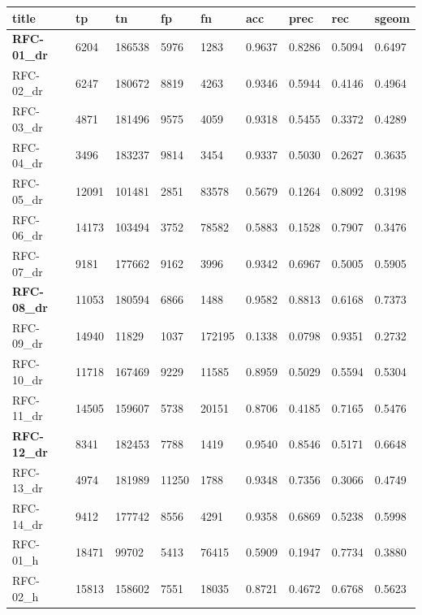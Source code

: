 \documentclass[12pt]{article}
\begin{document}
\begin{flushleft}
\begin{landscape}
		\begin{tabular}{| l | l | l | l | l | l | l | l | l |}
			\rowcolor{gray!50}
			\hline
			title & tp & tn & fp & fn & acc & prec & rec & sgeom \\ \hline
			\textbf{RFC-01\_dr} & 6204 & 186538 & 5976 & 1283 & 0.9637 & 0.8286 & 0.5094 & 0.6497 \\ \hline
			RFC-02\_dr & 6247 & 180672 & 8819 & 4263 & 0.9346 & 0.5944 & 0.4146 & 0.4964 \\ \hline
			RFC-03\_dr & 4871 & 181496 & 9575 & 4059 & 0.9318 & 0.5455 & 0.3372 & 0.4289 \\ \hline
			RFC-04\_dr & 3496 & 183237 & 9814 & 3454 & 0.9337 & 0.5030 & 0.2627 & 0.3635 \\ \hline
			RFC-05\_dr & 12091 & 101481 & 2851 & 83578 & 0.5679 & 0.1264 & 0.8092 & 0.3198 \\ \hline
			RFC-06\_dr & 14173 & 103494 & 3752 & 78582 & 0.5883 & 0.1528 & 0.7907 & 0.3476 \\ \hline
			RFC-07\_dr & 9181 & 177662 & 9162 & 3996 & 0.9342 & 0.6967 & 0.5005 & 0.5905 \\ \hline
			\textbf{RFC-08\_dr} & 11053 & 180594 & 6866 & 1488 & 0.9582 & 0.8813 & 0.6168 & 0.7373 \\ \hline
			RFC-09\_dr & 14940 & 11829 & 1037 & 172195 & 0.1338 & 0.0798 & 0.9351 & 0.2732 \\ \hline
			RFC-10\_dr & 11718 & 167469 & 9229 & 11585 & 0.8959 & 0.5029 & 0.5594 & 0.5304 \\ \hline
			RFC-11\_dr & 14505 & 159607 & 5738 & 20151 & 0.8706 & 0.4185 & 0.7165 & 0.5476 \\ \hline
			\textbf{RFC-12\_dr} & 8341 & 182453 & 7788 & 1419 & 0.9540 & 0.8546 & 0.5171 & 0.6648 \\ \hline
			RFC-13\_dr & 4974 & 181989 & 11250 & 1788 & 0.9348 & 0.7356 & 0.3066 & 0.4749 \\ \hline
			RFC-14\_dr & 9412 & 177742 & 8556 & 4291 & 0.9358 & 0.6869 & 0.5238 & 0.5998 \\ \hline
			RFC-01\_h & 18471 & 99702 & 5413 & 76415 & 0.5909 & 0.1947 & 0.7734 & 0.3880 \\ \hline
			RFC-02\_h & 15813 & 158602 & 7551 & 18035 & 0.8721 & 0.4672 & 0.6768 & 0.5623 \\ \hline

\end{tabular}
\end{landscape}
\end{flushleft}
\end{document}

